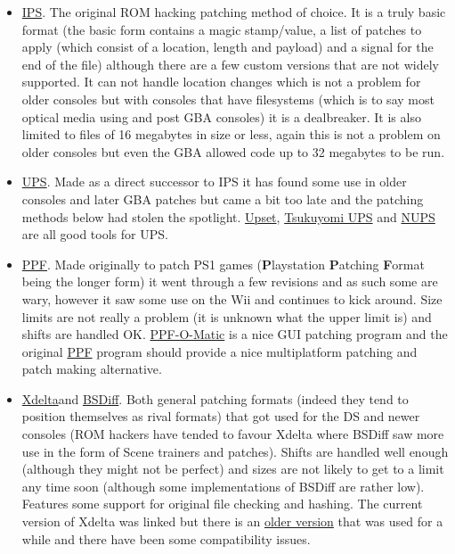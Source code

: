 \documentclass[
]{book}
\providecommand{\tightlist}{%
  \setlength{\itemsep}{0pt}\setlength{\parskip}{0pt}}
\begin{document}
\begin{itemize}
\tightlist
\item
  \href{https://www.romhacking.net/utilities/13/}{IPS}. The original ROM hacking patching method of choice. It is a truly basic format (the basic form contains a magic stamp/value, a list of patches to apply (which consist of a location, length and payload) and a signal for the end of the file) although there are a few custom versions that are not widely supported. It can not handle location changes which is not a problem for older consoles but with consoles that have filesystems (which is to say most optical media using and post GBA consoles) it is a dealbreaker. It is also limited to files of 16 megabytes in size or less, again this is not a problem on older consoles but even the GBA allowed code up to 32 megabytes to be run.
\item
  \href{http://www.romhacking.net/utilities/519/}{UPS}. Made as a direct successor to IPS it has found some use in older consoles and later GBA patches but came a bit too late and the patching methods below had stolen the spotlight. \href{http://www.romhacking.net/utilities/677/\%20}{Upset}, \href{http://www.romhacking.net/utilities/519/}{Tsukuyomi UPS} and \href{http://www.romhacking.net/utilities/606/}{NUPS} are all good tools for UPS.
\item
  \href{http://www.romhacking.net/utilities/514/}{PPF}. Made originally to patch PS1 games (\textbf{P}laystation \textbf{P}atching \textbf{F}ormat being the longer form) it went through a few revisions and as such some are wary, however it saw some use on the Wii and continues to kick around. Size limits are not really a problem (it is unknown what the upper limit is) and shifts are handled OK. \href{http://filetrip.net/pc-downloads/applications/download-ppf-o-matic-30-f29416.html}{PPF-O-Matic} is a nice GUI patching program and the original \href{http://www.romhacking.net/utilities/353/}{PPF} program should provide a nice multiplatform patching and patch making alternative.
\item
  \href{http://xdelta.org/}{Xdelta}and \href{http://www.daemonology.net/bsdiff/}{BSDiff}. Both general patching formats (indeed they tend to position themselves as rival formats) that got used for the DS and newer consoles (ROM hackers have tended to favour Xdelta where BSDiff saw more use in the form of Scene trainers and patches). Shifts are handled well enough (although they might not be perfect) and sizes are not likely to get to a limit any time soon (although some implementations of BSDiff are rather low). Features some support for original file checking and hashing. The current version of Xdelta was linked but there is an \href{http://www.evanjones.ca/software/xdelta-win32.html}{older version} that was used for a while and there have been some compatibility issues.

\end{itemize}
\end{document}
